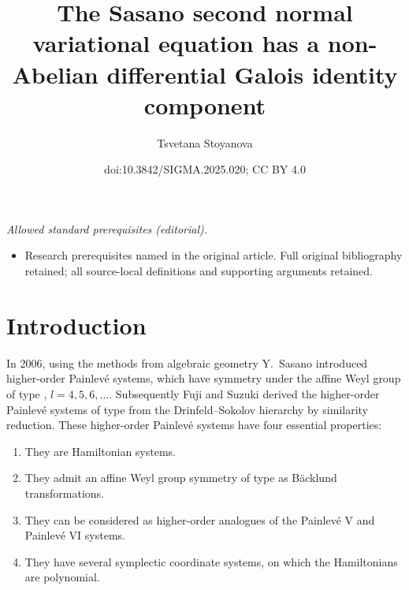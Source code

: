 \documentclass[10pt,a4paper]{amsart}
\title{The Sasano second normal variational equation has a non-Abelian differential Galois identity component}
\author{Tsvetana Stoyanova}
\date{doi:10.3842/SIGMA.2025.020; CC BY 4.0}
\numberwithin{equation}{section}
\begin{document}
\maketitle
\noindent\textit{Allowed standard prerequisites (editorial).}\begin{itemize}
\item Research prerequisites named in the original article. Full original bibliography retained; all source-local definitions and supporting arguments retained.
\end{itemize}\medskip
\section{Introduction}

 In 2006, using the methods from algebraic geometry Y.~Sasano \cite{Sa} introduced higher-order Painlev\'{e}
 systems, which have symmetry under the affine Weyl group of type , $l=4, 5, 6, \dots$. Subsequently Fuji and Suzuki \cite{FS} derived the higher-order
 Painlev\'{e} systems of type  from the Drinfeld--Sokolov hierarchy by similarity reduction.
 These higher-order Painlev\'{e} systems have four essential properties:
 \begin{enumerate}\itemsep=0pt
 \item They are Hamiltonian systems.
 	\item
 	They admit an affine Weyl group symmetry of type  as B\"{a}cklund transformations.
 	\item
 	They can be considered as higher-order analogues of the Painlev\'{e} V and Painlev\'e VI systems.
 	\item
 	They have several symplectic coordinate systems, on which the Hamiltonians are polynomial.
 \end{enumerate}
\end{document}
